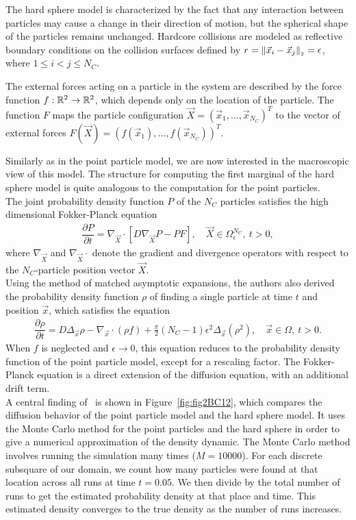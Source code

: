 The hard sphere model is characterized by the fact that any interaction between particles may cause a change in their direction of motion, but the spherical shape of the particles remains unchanged.
Hardcore collisions are modeled as reflective boundary conditions on the collision surfaces defined by $r = \norm[\vec{x}_i - \vec{x}_j] = \epsilon$, where $1 \leq i < j \leq N_C$.

The external forces acting on a particle in the system are described by the force function $f: \mathbb{R}^2 \rightarrow \mathbb{R}^2$, which depends only on the location of the particle.
The function $F$ maps the particle configuration $\vec{X} = (\vec{x}_1, \ldots, \vec{x}_{N_C})^T$ to the vector of external forces $F(\vec{X}) = (f(\vec{x}_1), \ldots, f(\vec{x}_{N_C}))^T$.


Similarly as in the point particle model, we are now interested in the macroscopic view of this model. 
The structure for computing the first marginal of the hard sphere model is quite analogous to the computation for the point particles. \\
The joint probability density function $P$ of the $N_C$ particles satisfies the high dimensional Fokker-Planck equation
\begin{align*}
	\dfrac{\partial P}{\partial t} = \nabla_{\vec{X}} \cdot [ D \nabla_{\vec{X}} P - P F], \quad \vec{X} \in \Omega_{\epsilon}^{N_C}, \: t > 0,
\end{align*}
where $\nabla_{\vec{X}}$ and $\nabla_{\vec{X}} \cdot$ denote the gradient and divergence operators with respect to the $N_C$-particle position vector $\vec{X}$.\\
Using the method of matched asymptotic expansions, the authors also derived the probability density function $\rho$ of finding a single particle at time $t$ and position $\vec{x}$, which satisfies the equation
\begin{align}
	\dfrac{\partial \rho}{\partial t} = D \Delta_{\vec{x}} \rho - \nabla_{\vec{x}} \cdot (\rho f) + \frac{\pi}{2} (N_C - 1) \epsilon^2 \Delta_{\vec{x}} (\rho^2), \quad \vec{x} \in \Omega, \: t>0 .
	\label{equ:hardsphere}
\end{align}
When $f$ is neglected and $\epsilon \rightarrow 0$, this equation reduces to the probability density function of the point particle model, except for a rescaling factor.
The Fokker-Planck equation is a direct extension of the diffusion equation, with an additional drift term.\\
A central finding of~\cite{Bruna2012} is shown in Figure~\ref{fig:fig2BC12}, which compares the diffusion behavior of the point particle model and the hard sphere model. 
It uses the Monte Carlo method for the point particles and the hard sphere in order to give a numerical approximation of the density dynamic. 
The Monte Carlo method involves running the simulation many times ($M=10000$). 
For each discrete subsquare of our domain, we count how many particles were found at that location across all runs at time $t=0.05$. 
We then divide by the total number of runs to get the estimated probability density at that place and time. 
This estimated density converges to the true density as the number of runs increases. \\

